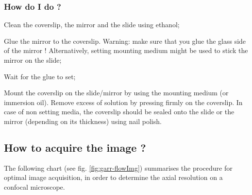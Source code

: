 \documentclass[a4paper, 11pt]{report}%
\begin{document}
\subsubsection{How do I do ?}
\label{sec:garr-proto-how}

\begin{enumerate*}
	\item Clean the coverslip, the mirror and the slide using ethanol;
	\item Glue the mirror to the coverslip. Warning: make sure that you glue the glass side of the mirror ! Alternatively, setting mounting medium might be used to stick the mirror on the slide;
	\item Wait for the glue to set;
	\item Mount the coverslip on the slide/mirror by using the mounting medium (or immersion oil). Remove excess of solution by pressing firmly on the coverslip. In case of non setting media, the coverslip should be sealed onto the slide or the mirror (depending on its thickness) using nail polish.
\end{enumerate*}


\subsection{How to acquire the image ?}
\label{sec:garr-flow}

The following chart (see fig. \ref{fig:garr-flowImg}) summarises the procedure for optimal image acquisition, in order to determine the axial resolution on a confocal microscope.
\end{document}
